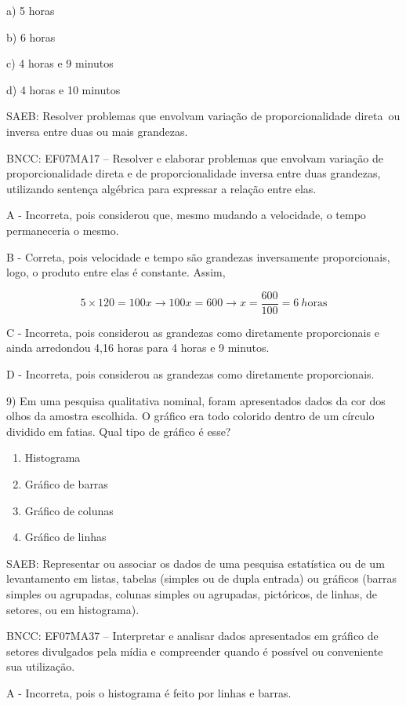 a) 5 horas

b) 6 horas

c) 4 horas e 9 minutos

d) 4 horas e 10 minutos

SAEB: Resolver problemas que envolvam variação de proporcionalidade
direta~ou inversa entre duas ou mais grandezas.

BNCC: EF07MA17 -- Resolver e elaborar problemas que envolvam variação de
proporcionalidade direta e de proporcionalidade inversa entre duas
grandezas, utilizando sentença algébrica para expressar a relação entre
elas.

A - Incorreta, pois considerou que, mesmo mudando a velocidade, o tempo
permaneceria o mesmo.

B - Correta, pois velocidade e tempo são grandezas inversamente
proporcionais, logo, o produto entre elas é constante. Assim,

\[5 \times 120 = 100x \rightarrow 100x = 600 \rightarrow x = \frac{600}{100} = 6\ h\text{oras}\]

C - Incorreta, pois considerou as grandezas como diretamente
proporcionais e ainda arredondou 4,16 horas para 4 horas e 9 minutos.

D - Incorreta, pois considerou as grandezas como diretamente
proporcionais.

9) Em uma pesquisa qualitativa nominal, foram apresentados dados da cor
dos olhos da amostra escolhida. O gráfico era todo colorido dentro de um
círculo dividido em fatias. Qual tipo de gráfico é esse?

\begin{enumerate}
\def\labelenumi{\alph{enumi}.}
\item
  Histograma
\item
  Gráfico de barras
\item
  Gráfico de colunas
\item
  Gráfico de linhas~
\end{enumerate}

SAEB: Representar ou associar os dados de uma pesquisa estatística ou de
um levantamento em listas, tabelas (simples ou de dupla entrada) ou
gráficos (barras simples ou agrupadas, colunas simples ou agrupadas,
pictóricos, de linhas, de setores, ou em histograma).

BNCC: EF07MA37 -- Interpretar e analisar dados apresentados em gráfico
de setores divulgados pela mídia e compreender quando é possível ou
conveniente sua utilização.

A - Incorreta, pois o histograma é feito por linhas e barras.

